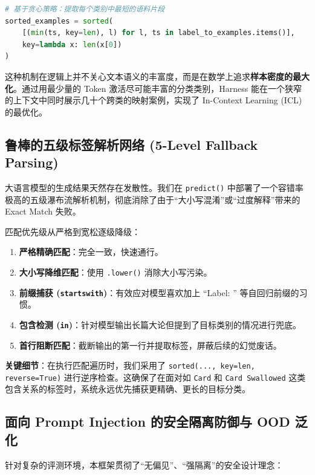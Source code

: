 \documentclass[11pt, a4paper]{ctexart}
\begin{document}
\begin{lstlisting}[language=Python]
# 基于贪心策略：提取每个类别中最短的语料片段
sorted_examples = sorted(
    [(min(ts, key=len), l) for l, ts in label_to_examples.items()],
    key=lambda x: len(x[0])
)
\end{lstlisting}

\begin{highlightbox}[设计优势]
这种机制在逻辑上并不关心文本语义的丰富度，而是在数学上追求\textbf{样本密度的最大化}。通过用最少量的 Token 激活尽可能丰富的分类类别，Harness 能在一个狭窄的上下文中同时展示几十个跨类的映射案例，实现了 In-Context Learning (ICL) 的最优化。
\end{highlightbox}

\subsection{鲁棒的五级标签解析网络 (5-Level Fallback Parsing)}

大语言模型的生成结果天然存在发散性。我们在 \texttt{predict()} 中部署了一个容错率极高的五级瀑布流解析机制，彻底消除了由于“大小写混淆”或“过度解释”带来的 Exact Match 失败。

匹配优先级从严格到宽松逐级降级：
\begin{enumerate}
    \item \textbf{严格精确匹配}：完全一致，快速通行。
    \item \textbf{大小写降维匹配}：使用 \texttt{.lower()} 消除大小写污染。
    \item \textbf{前缀捕获 (\texttt{startswith})}：有效应对模型喜欢加上 ``Label: '' 等自回归前缀的习惯。
    \item \textbf{包含检测 (\texttt{in})}：针对模型输出长篇大论但提到了目标类别的情况进行兜底。
    \item \textbf{首行阻断匹配}：截断输出的第一行并提取标签，屏蔽后续的幻觉废话。
\end{enumerate}

\textbf{关键细节}：在执行匹配遍历时，我们采用了 \texttt{sorted(..., key=len, reverse=True)} 进行逆序检查。这确保了在面对如 \texttt{Card} 和 \texttt{Card Swallowed} 这类包含关系的标签时，系统永远优先捕获更精确、更长的目标分类。

\subsection{面向 Prompt Injection 的安全隔离防御与 OOD 泛化}

针对复杂的评测环境，本框架贯彻了“无偏见”、“强隔离”的安全设计理念：
\end{document}
